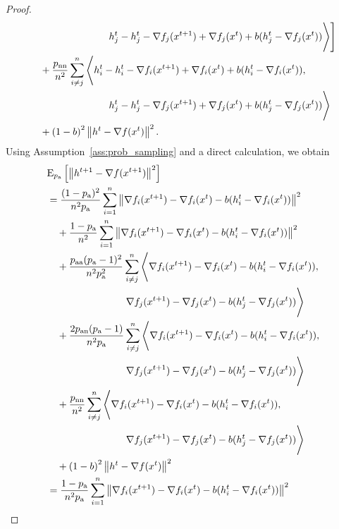 \documentclass{article}
\newcommand*{\probavailable}{\ensuremath{p_{\textnormal{a}}}}
\newcommand*{\probpairaa}{\ensuremath{p_{\textnormal{aa}}}}
\newcommand*{\probpairan}{\ensuremath{p_{\textnormal{an}}}}
\newcommand*{\probpairnn}{\ensuremath{p_{\textnormal{nn}}}}
\begin{document}
\begin{proof}
\begin{align*}
      &\qquad\qquad\qquad\qquad h^{t}_j - h^{t}_j - \nabla f_j(x^{t+1}) + \nabla f_j(x^{t}) + b(h^t_j - \nabla f_j(x^{t}))\Bigg\rangle\Bigg] \\
      &\quad +\frac{\probpairnn}{n^2}\sum_{i \neq j}^n\Bigg\langle h^{t}_i - h^{t}_i - \nabla f_i(x^{t+1}) + \nabla f_i(x^{t}) + b(h^t_i - \nabla f_i(x^{t})), \\
      &\qquad\qquad\qquad\qquad h^{t}_j - h^{t}_j - \nabla f_j(x^{t+1}) + \nabla f_j(x^{t}) + b(h^t_j - \nabla f_j(x^{t}))\Bigg\rangle \\
      &\quad + \left(1 - b\right)^2 \norm{h^{t} - \nabla f(x^{t})}^2.
  \end{align*}
  Using Assumption~\ref{ass:prob_sampling} and a direct calculation, we obtain
  \begin{align*}
    &\ExpSub{\probavailable}{\norm{h^{t+1} - \nabla f(x^{t+1})}^2} \\
    &=\frac{(1 - \probavailable)^2}{n^2 \probavailable}\sum_{i=1}^n \norm{\nabla f_i(x^{t+1}) - \nabla f_i(x^{t}) - b(h^t_i - \nabla f_i(x^{t}))}^2 \\
    &\quad + \frac{1 - \probavailable}{n^2}\sum_{i=1}^n \norm{\nabla f_i(x^{t+1}) - \nabla f_i(x^{t}) - b(h^t_i - \nabla f_i(x^{t}))}^2 \\
    &\quad +\frac{\probpairaa(\probavailable - 1)^2}{n^2 \probavailable^2}\sum_{i \neq j}^n\Bigg\langle \nabla f_i(x^{t+1}) - \nabla f_i(x^{t}) - b(h^t_i - \nabla f_i(x^{t})), \\
    &\qquad\qquad\qquad\qquad \nabla f_j(x^{t+1}) - \nabla f_j(x^{t}) - b(h^t_j - \nabla f_j(x^{t}))\Bigg\rangle \\
    &\quad +\frac{2\probpairan (\probavailable - 1)}{n^2 \probavailable}\sum_{i \neq j}^n\Bigg\langle \nabla f_i(x^{t+1}) - \nabla f_i(x^{t}) - b(h^t_i - \nabla f_i(x^{t})),\\
    &\qquad\qquad\qquad\qquad \nabla f_j(x^{t+1}) - \nabla f_j(x^{t}) - b(h^t_j - \nabla f_j(x^{t}))\Bigg\rangle \\
    &\quad +\frac{\probpairnn}{n^2}\sum_{i \neq j}^n\Bigg\langle \nabla f_i(x^{t+1}) - \nabla f_i(x^{t}) - b(h^t_i - \nabla f_i(x^{t})), \\
    &\qquad\qquad\qquad\qquad \nabla f_j(x^{t+1}) - \nabla f_j(x^{t}) - b(h^t_j - \nabla f_j(x^{t}))\Bigg\rangle \\
    &\quad + \left(1 - b\right)^2 \norm{h^{t} - \nabla f(x^{t})}^2 \\
    &=\frac{1 - \probavailable}{n^2 \probavailable}\sum_{i=1}^n \norm{\nabla f_i(x^{t+1}) - \nabla f_i(x^{t}) - b(h^t_i - \nabla f_i(x^{t}))}^2 \\

\end{align*}
\end{proof}
\end{document}
